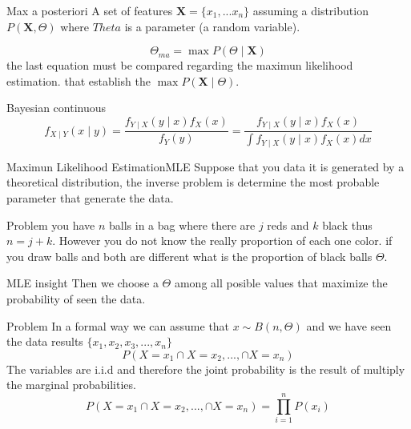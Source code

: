 \documentclass{beamer}
\begin{document}
\begin{frame}{Max a posteriori}
A set of features $\mathbf{X} = \lbrace x_{1},...x_{n} \rbrace$
assuming a distribution $P(\mathbf{X}, \Theta)$ where $Theta$ is a parameter (a random variable).

\begin{equation}
\Theta_{ma} = \max P(\Theta \mid \mathbf{X})
\end{equation}
the last equation must be compared regarding the maximun likelihood estimation. that establish the $\max P(\mathbf{X} \mid \Theta)$.

\end{frame}

\begin{frame}

\end{frame}


\begin{frame}{Bayesian continuous}
\begin{equation}
f_{X \mid Y}(x \mid y) = \frac{f_{Y \mid X}(y \mid x)f_{X}(x)}{f_{Y}(y)} = \frac{f_{Y \mid X}(y \mid x)f_{X}(x)}{ \int f_{Y \mid X}(y \mid x)f_{X}(x)dx}
\end{equation}
\end{frame}











\begin{frame}{Maximun Likelihood Estimation}{MLE}
Suppose that you data it is generated by a theoretical distribution, the inverse problem is determine the most probable parameter that generate the data.
\end{frame}

\begin{frame}{Problem}
you have $n$ balls in a bag where there are $j$ reds and $k$ black thus $n= j+k$. However you do not know the really proportion of each one color. if you draw balls and both are different what is the proportion of black balls $\Theta$.

\begin{block}{MLE insight }
Then we choose a $\Theta$ among all posible values that maximize the probability of seen the data.
\end{block}
\end{frame}

\begin{frame}{Problem}
In a formal way we can assume that $x \sim B(n,\Theta)$ and we have seen the data results $\lbrace x_{1},x_{2},x_{3},...,x_{n} \rbrace$ 
\begin{equation}
P(X=x_{1} \cap X=x_{2},...,\cap X= x_{n})
\end{equation}
The variables are i.i.d and therefore the joint probability is the result of multiply the marginal probabilities.
\begin{equation}
P(X=x_{1} \cap X=x_{2},...,\cap X= x_{n}) = \prod_{i=1}^{n} P(x_{i})
\end{equation}
\end{frame}
\end{document}
